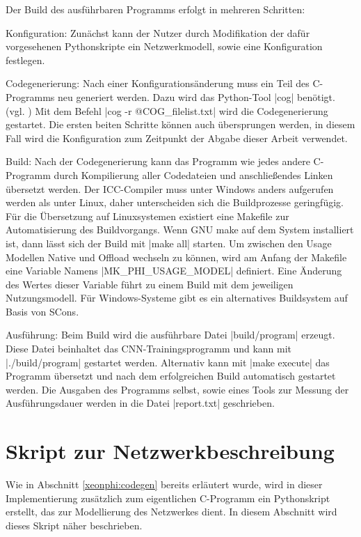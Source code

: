 \documentclass[../main.tex]{subfiles}
\begin{document}
Der Build des ausführbaren Programms erfolgt in mehreren Schritten: 
\begin{description}
\item{Konfiguration: } Zunächst kann der Nutzer durch Modifikation der dafür vorgesehenen Pythonskripte ein Netzwerkmodell, sowie eine Konfiguration festlegen. 
\item{Codegenerierung: } Nach einer Konfigurationsänderung muss ein Teil des C-Programms neu generiert werden. Dazu wird das Python-Tool |cog| benötigt. (vgl. \cite{COGdocumentation}) Mit dem Befehl |cog -r @COG_filelist.txt| wird die Codegenerierung gestartet. Die ersten beiten Schritte können auch übersprungen werden, in diesem Fall wird die Konfiguration zum Zeitpunkt der Abgabe dieser Arbeit verwendet. 
\item{Build: } Nach der Codegenerierung kann das Programm wie jedes andere C-Programm durch Kompilierung aller Codedateien und anschließendes Linken übersetzt werden. Der ICC-Compiler muss unter Windows anders aufgerufen werden als unter Linux, daher unterscheiden sich die Buildprozesse geringfügig. Für die Übersetzung auf Linuxsystemen existiert eine Makefile zur Automatisierung des Buildvorgangs. Wenn GNU make auf dem System installiert ist, dann lässt sich der Build mit |make all| starten. Um zwischen den Usage Modellen Native und Offload wechseln zu können, wird am Anfang der Makefile eine Variable Namens |MK_PHI_USAGE_MODEL| definiert. Eine Änderung des Wertes dieser Variable führt zu einem Build mit dem jeweiligen Nutzungsmodell. Für Windows-Systeme gibt es ein alternatives Buildsystem auf Basis von SCons. 
\item{Ausführung: } Beim Build wird die ausführbare Datei |build/program| erzeugt. Diese Datei beinhaltet das CNN-Trainingsprogramm und kann mit |./build/program| gestartet werden. Alternativ kann mit |make execute| das Programm übersetzt und nach dem erfolgreichen Build automatisch gestartet werden. Die Ausgaben des Programms selbst, sowie eines Tools zur Messung der Ausführungsdauer werden in die Datei |report.txt| geschrieben. 
\end{description}

\section{Skript zur Netzwerkbeschreibung}
Wie in Abschnitt \ref{xeonphi:codegen} bereits erläutert wurde, wird in dieser Implementierung zusätzlich zum eigentlichen C-Programm ein Pythonskript erstellt, das zur Modellierung des Netzwerkes dient. In diesem Abschnitt wird dieses Skript näher beschrieben. 
\end{document}
